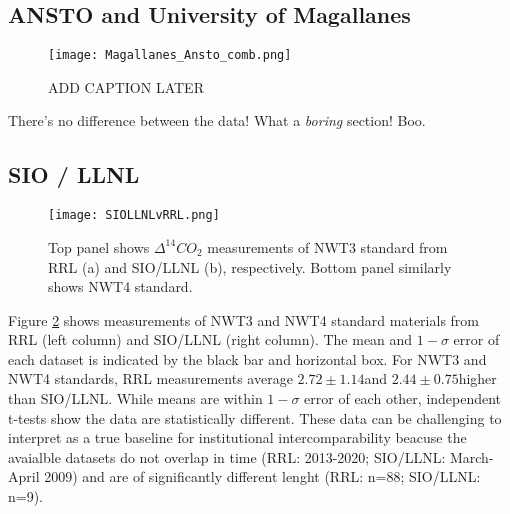 \documentclass{article}
\begin{document}
\newpage
\subsection{ANSTO and University of Magallanes}
\begin{figure}[h!]
  \texttt{[image: Magallanes\_Ansto\_comb.png]}
  \caption{ADD CAPTION LATER}
  \label{fig:results1}
\end{figure}

There's no difference between the data! What a \textit{boring} section! Boo. 


\newpage
\subsection{SIO / LLNL}

\begin{figure}[h!]
  \texttt{[image: SIOLLNLvRRL.png]}
  \caption{Top panel shows ${\Delta^{14}CO_{2}}$ measurements of NWT3 standard from RRL (a) and SIO/LLNL (b), respectively. Bottom panel similarly shows NWT4 standard.}
  \label{fig:siollnl}
\end{figure}

Figure \ref{fig:siollnl} shows measurements of NWT3 and NWT4 standard materials from RRL (left column) and SIO/LLNL (right column). The mean and $1-\sigma$ error of each dataset is indicated by the black bar and horizontal box. For NWT3 and NWT4 standards, RRL measurements average $2.72\pm1.14$\textperthousand and $2.44\pm0.75$\textperthousand higher than SIO/LLNL. While means are within $1-\sigma$ error of each other, independent t-tests show the data are statistically different. 
These data can be challenging to interpret as a true baseline for institutional intercomparability beacuse the avaialble datasets do not overlap in time (RRL: 2013-2020; SIO/LLNL: March-April 2009) and are of significantly different lenght (RRL: n=88; SIO/LLNL: n=9).
\end{document}
